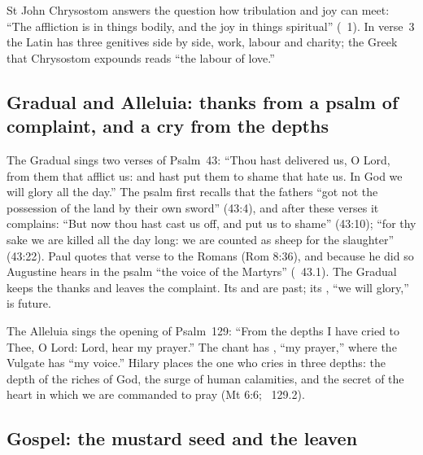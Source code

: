 St John Chrysostom answers the question how tribulation and joy can meet:
``The affliction is in things bodily, and the joy in things spiritual''
(~1). In verse~3 the Latin has three genitives side by side, work,
labour and charity; the Greek that Chrysostom expounds reads ``the labour of
love.''

\subsection{Gradual and Alleluia: thanks from a psalm of complaint, and a cry from the depths}

The Gradual sings two verses of Psalm~43: ``Thou hast delivered us, O Lord,
from them that afflict us: and hast put them to shame that hate us. In God we
will glory all the day.'' The psalm first recalls that the fathers ``got not
the possession of the land by their own sword'' (43:4), and after these verses it
complains: ``But now thou hast cast us off, and put us to shame'' (43:10);
``for thy sake we are killed all the day long: we are counted as sheep for the
slaughter'' (43:22). Paul quotes that verse to the Romans (Rom 8:36), and
because he did so Augustine hears in the psalm ``the voice of the Martyrs''
(~43.1). The Gradual keeps the thanks and leaves the
complaint. Its  and  are past; its
, ``we will glory,'' is future.

The Alleluia sings the opening of Psalm~129: ``From the depths I have cried to
Thee, O Lord: Lord, hear my prayer.'' The chant has ,
``my prayer,'' where the Vulgate has ``my voice.'' Hilary places the
one who cries in three depths: the depth of the riches of God, the surge of
human calamities, and the secret of the heart in which we are commanded to
pray (Mt 6:6; ~129.2).

\subsection{Gospel: the mustard seed and the leaven}

